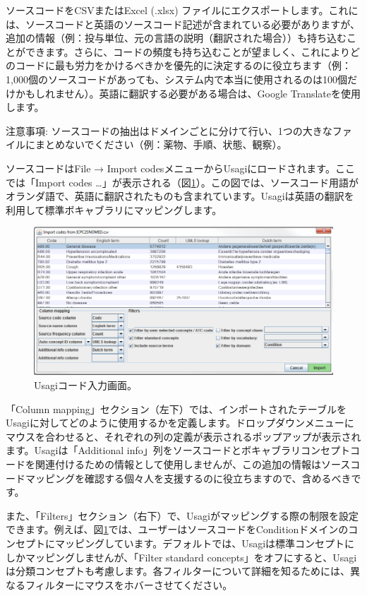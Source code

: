 \documentclass[
  11pt]{book}
\theoremstyle{definition}
\theoremstyle{definition}
\theoremstyle{definition}
\theoremstyle{definition}
\theoremstyle{remark}
\begin{document}
ソースコードをCSVまたはExcel (.xlsx) ファイルにエクスポートします。これには、ソースコードと英語のソースコード記述が含まれている必要がありますが、追加の情報（例：投与単位、元の言語の説明（翻訳された場合））も持ち込むことができます。さらに、コードの頻度も持ち込むことが望ましく、これによりどのコードに最も労力をかけるべきかを優先的に決定するのに役立ちます（例：1,000個のソースコードがあっても、システム内で本当に使用されるのは100個だけかもしれません）。英語に翻訳する必要がある場合は、Google Translateを使用します。

注意事項: ソースコードの抽出はドメインごとに分けて行い、1つの大きなファイルにまとめないでください（例：薬物、手順、状態、観察）。

ソースコードはFile → Import codesメニューからUsagiにロードされます。ここでは「Import codes \ldots」が表示される（図\ref{fig:usagiImport}）。この図では、ソースコード用語がオランダ語で、英語に翻訳されたものも含まれています。Usagiは英語の翻訳を利用して標準ボキャブラリにマッピングします。

\begin{figure}

{\centering \includegraphics[width=1\linewidth]{images/ExtractTransformLoad/usagiImport} 

}

\caption{Usagiコード入力画面。}\label{fig:usagiImport}
\end{figure}

「Column mapping」セクション（左下）では、インポートされたテーブルをUsagiに対してどのように使用するかを定義します。ドロップダウンメニューにマウスを合わせると、それぞれの列の定義が表示されるポップアップが表示されます。Usagiは「Additional info」列をソースコードとボキャブラリコンセプトコードを関連付けるための情報として使用しませんが、この追加の情報はソースコードマッピングを確認する個々人を支援するのに役立ちますので、含めるべきです。

また、「Filters」セクション（右下）で、Usagiがマッピングする際の制限を設定できます。例えば、図\ref{fig:usagiImport}では、ユーザーはソースコードをConditionドメインのコンセプトにマッピングしています。デフォルトでは、Usagiは標準コンセプトにしかマッピングしませんが、「Filter standard concepts」をオフにすると、Usagiは分類コンセプトも考慮します。各フィルターについて詳細を知るためには、異なるフィルターにマウスをホバーさせてください。
\end{document}
